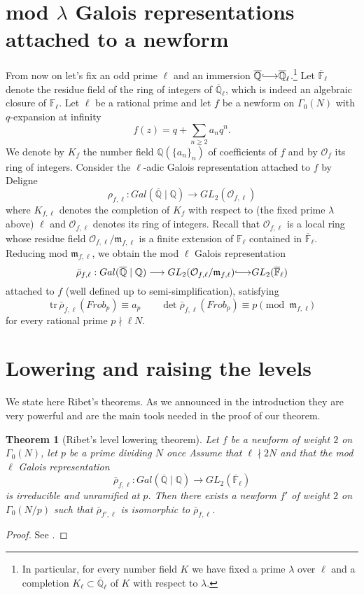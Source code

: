 \documentclass[12pt,reqno]{amsart}
\theoremstyle{plain}
\newtheorem{theorem}{Theorem}[section]
\theoremstyle{definition}
\begin{document}
\section{mod $\lambda$ Galois representations attached to a newform}
From now on let's fix an odd prime $\ell$ and an immersion $\overline{\mathbb Q}{\lhook\joinrel\longrightarrow} \overline{\mathbb Q}_\ell$.\footnote{In particular, for every number field $K$ we have fixed a prime $\lambda$ over $\ell$ and a completion  $K_{\ell}\subset \overline{\mathbb Q}_\ell$ of $K$ with respect to $\lambda$.} Let $\overline{\mathbb F}_\ell$ denote the residue field of the ring of integers of $\overline{\mathbb Q}_\ell$, which is indeed an algebraic closure of $\mathbb F_\ell$.
Let $\ell$ be a rational prime and let $f$ be a newform on $\Gamma_0(N)$ with $q$-expansion at infinity
$$
f(z) = q + \sum_{n\geq 2} a_n q^n.
$$
We denote by $K_f$  the number field $\mathbb Q(\{a_n\}_n)$ of coefficients of $f$ and by $\mathcal O_f$ its ring of integers. Consider the $\ell$-adic Galois representation attached to $f$ by Deligne
$$
\rho_{f,\ell}: Gal(\overline{\mathbb Q}\mid \mathbb Q)\rightarrow GL_2(\mathcal O_{f,\ell})
$$
where $K_{f,\ell}$ denotes the completion of $K_f$ with respect to (the fixed prime $\lambda$ above) $\ell$ and $\mathcal O_{f,\ell}$ denotes its ring of integers. Recall that $\mathcal O_{f,\ell}$ is a local ring whose residue field $\mathcal O_{f,\ell}/\mathfrak m_{f,\ell}$ is a finite extension of $\mathbb F_\ell$ contained in $\overline{\mathbb F}_\ell$. Reducing mod $\mathfrak m_{f,\ell}$, we obtain the mod $\ell$ Galois representation
$$
\bar\rho_{f,\ell}:Gal(\overline{\mathbb Q}\mid\mathbb Q)\longrightarrow GL_2(\mathcal O_{f,\ell}/\mathfrak m_{f,\ell}){\lhook\joinrel\longrightarrow} GL_2(\overline{\mathbb F}_\ell)
$$
attached to $f$ (well defined up to semi-simplification), satisfying
$$
\text{tr}\,\bar\rho_{f,\ell} (Frob_p) \equiv a_p\qquad \det\bar\rho_{f,\ell}(Frob_p)\equiv p \pmod {\mathfrak m_{f,\ell}}
$$
for every rational prime $p\nmid \ell N$. 
\section{ Lowering and raising the levels}
We state here Ribet's theorems. As we announced in the introduction they are very powerful and are the main tools needed in the proof of our theorem.
\begin{theorem}[Ribet's level lowering theorem]
Let $f$ be a newform of weight $2$ on $\Gamma_0(N)$, let $p$ be a prime dividing $N$ once Assume that $\ell\nmid2N$ and that the mod $\ell$ Galois representation 
$$
\bar\rho_{f,\ell}:Gal(\overline{\mathbb Q}\mid \mathbb Q)\longrightarrow GL_2(\overline{\mathbb F}_\ell)
$$
is irreducible and unramified at $p$. Then there exists a newform $f'$ of weight $2$ on $\Gamma_0(N/p)$ such that $\bar\rho_{f',\ell}$ is isomorphic to $\bar\rho_{f,\ell}$.
\end{theorem}
\begin{proof}
See \cite{RibetLow}.
\end{proof}
\end{document}
